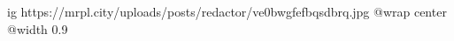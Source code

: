  
 
 
 
 

\ifcmt
  ig https://mrpl.city/uploads/posts/redactor/ve0bwgfefbqsdbrq.jpg
  @wrap center
  @width 0.9
\fi

